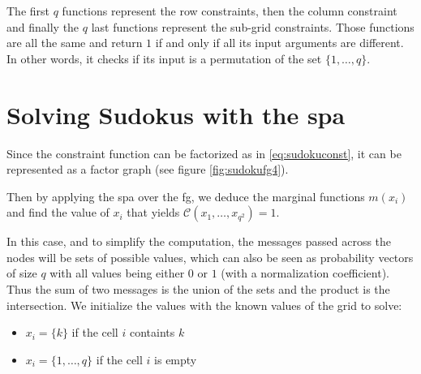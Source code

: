 \documentclass[a4paper,11pt]{report}
\newcommand{\set}[1]{\{#1\}}
\begin{document}
The first $q$ functions represent the row constraints, then the column constraint and finally the $q$ last functions represent the sub-grid constraints. Those functions are all the same and return $1$ if and only if all its input arguments are different. In other words, it checks if its input is a permutation of the set $\set{1,\dots,q}$.


\section{Solving Sudokus with the \acl{spa}}

Since the constraint function can be factorized as in \eqref{eq:sudokuconst}, it can be represented as a factor graph (see figure \ref{fig:sudokufg4}).

Then by applying the \ac{spa} over the \ac{fg}, we deduce the marginal functions $m(x_i)$ and find the value of $x_i$ that yields $\mathcal{C}(x_1,\dots,x_{q^2}) = 1$.

In this case, and to simplify the computation, the messages passed across the nodes will be sets of possible values, which can also be seen as probability vectors of size $q$ with all values being either $0$ or $1$ (with a normalization coefficient). Thus the sum of two messages is the union of the sets and the product is the intersection. We initialize the values with the known values of the grid to solve:
\begin{itemize}
\item $x_i = \set{k}$ if the cell $i$ containts $k$
\item $x_i = \set{1,\dots,q}$ if the cell $i$ is empty
\end{itemize}
\end{document}
